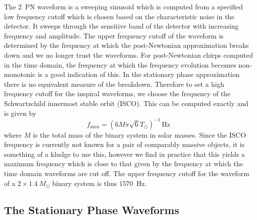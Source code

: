 The 2~PN waveform is a sweeping sinusoid which is computed from a specified 
low frequency cutoff which is chosen based on the characteristic noise in the
detector. It sweeps through the sensitive band of the detector with increasing
frequency and amplitude.  The upper frequency cutoff of the waveform is
determined by the frequency at which the post-Newtonian approximation breaks
down and we no longer trust the waveforms. For post-Newtonian chirps computed
in the time domain, the frequency at which the frequency evolution becomes
non-monotonic is a good indication of this.  In the stationary phase
approximation there is no equivalent measure of the breakdown.  Therefore to
set a high frequency cutoff for the inspiral waveforms, we choose the
frequency of the Schwartzchild innermost stable orbit (ISCO). This can be
computed exactly and is given by
\begin{equation}
f_{\mathrm{max}} = \left( 6M\pi\sqrt{6}T_\odot \right)^{-1}\,\mathrm{Hz}
\label{eq:isco}
\end{equation} where $M$ is the total mass of the binary system in solar
masses. Since the ISCO frequency is currently not known for a pair of
comparably massive objects, it is something of a kludge to use this, however
we find in practice that this yields a maximum frequency which is close to that
given by the frequency at which the time domain waveforms are cut off.  The
upper frequency cutoff for the waveform of a $2\times 1.4 \> M_\odot$ binary
system is thus $1570$~Hz.

\subsection{The Stationary Phase Waveforms}
\label{ss:stationaryphase}

